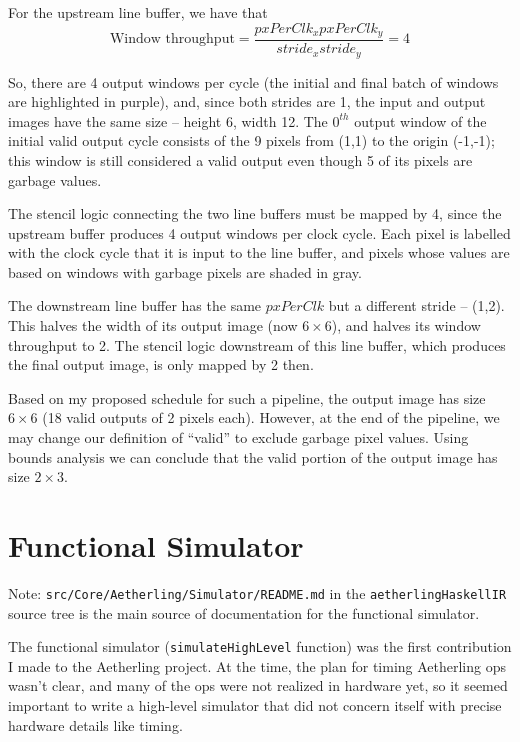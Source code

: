 \documentclass[12pt]{article}
\begin{document}
For the upstream line buffer, we have that
\begin{equation}
\text{Window throughput} =
\frac{pxPerClk_x pxPerClk_y}{stride_x stride_y} = 4
\end{equation}

So, there are 4 output windows per cycle (the initial and final batch
of windows are highlighted in purple), and, since both strides are 1,
the input and output images have the same size -- height 6, width
12. The $0^{th}$ output window of the initial valid output cycle
consists of the 9 pixels from (1,1) to the origin (-1,-1); this window
is still considered a valid output even though 5 of its pixels are
garbage values.

The stencil logic connecting the two line buffers must be mapped by 4,
since the upstream buffer produces 4 output windows per clock cycle.
Each pixel is labelled with the clock cycle that it is input to the
line buffer, and pixels whose values are based on windows with garbage
pixels are shaded in gray.

The downstream line buffer has the same $pxPerClk$ but a different
stride -- (1,2). This halves the width of its output image
(now $6\times 6$), and halves its window throughput to 2. The stencil logic
downstream of this line buffer, which produces the final output image,
is only mapped by 2 then.

Based on my proposed schedule for such a pipeline, the output image
has size $6 \times 6$ (18 valid outputs of 2 pixels each). However,
at the end of the pipeline, we may change our definition of ``valid''
to exclude garbage pixel values. Using bounds analysis we can conclude
that the valid portion of the output image has size $2 \times 3$.

\section{Functional Simulator}

Note: \texttt{src/Core/Aetherling/Simulator/README.md} in the
\texttt{aetherlingHaskellIR} source tree is the main source of
documentation for the functional simulator.

The functional simulator (\texttt{simulateHighLevel} function) was the
first contribution I made to the Aetherling project. At the time, the
plan for timing Aetherling ops wasn't clear, and many of the ops were
not realized in hardware yet, so it seemed important to write a
high-level simulator that did not concern itself with precise hardware
details like timing.
\end{document}
